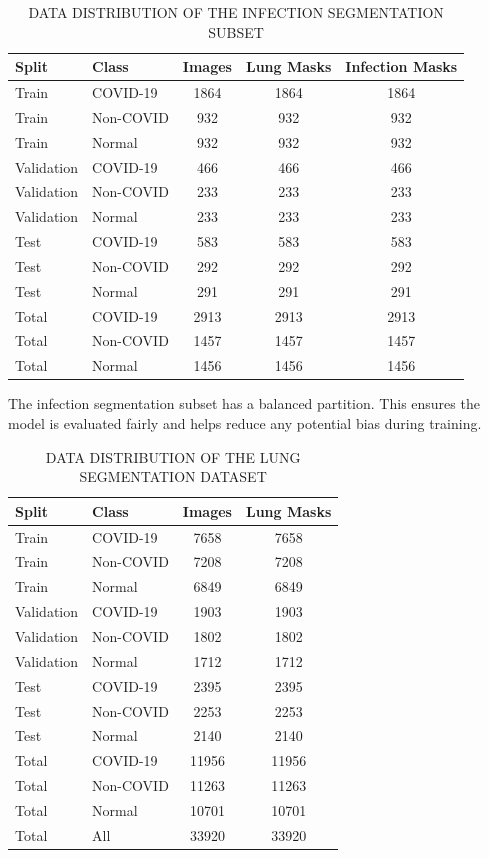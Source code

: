 \documentclass{IEEEtran}
\begin{document}
\renewcommand{\arraystretch}{1.2}
\begin{table}[h]
\centering
\caption{DATA DISTRIBUTION OF THE INFECTION SEGMENTATION SUBSET}
\label{tab:infection_distribution}
\begin{tabular}{l l c c c}
\toprule
\textbf{Split} & \textbf{Class} & \textbf{Images} & \textbf{Lung Masks} & \textbf{Infection Masks} \\
\midrule
Train & COVID-19  & 1864 & 1864 & 1864 \\
Train & Non-COVID & 932  & 932  & 932  \\
Train & Normal    & 932  & 932  & 932  \\
\midrule
Validation & COVID-19  & 466 & 466 & 466 \\
Validation & Non-COVID & 233 & 233 & 233 \\
Validation & Normal    & 233 & 233 & 233 \\
\midrule
Test & COVID-19  & 583 & 583 & 583 \\
Test & Non-COVID & 292 & 292 & 292 \\
Test & Normal    & 291 & 291 & 291 \\
\midrule
Total & COVID-19  & 2913 & 2913 & 2913 \\
Total & Non-COVID & 1457& 1457 & 1457 \\
Total & Normal    & 1456 & 1456 & 1456 \\
\bottomrule
\end{tabular}
\end{table}

The infection segmentation subset has a balanced partition. This ensures the model is evaluated fairly and helps reduce any potential bias during training.


\begin{table}[h]
\centering
\caption{DATA DISTRIBUTION OF THE LUNG SEGMENTATION DATASET}
\label{tab:lung_distribution}
\begin{tabular}{l l c c}
\toprule
\textbf{Split} & \textbf{Class} & \textbf{Images} & \textbf{Lung Masks} \\
\midrule
Train & COVID-19  & 7658 & 7658 \\
Train & Non-COVID & 7208 & 7208 \\
Train & Normal    & 6849 & 6849 \\
\midrule
Validation & COVID-19  & 1903 & 1903 \\
Validation & Non-COVID & 1802 & 1802 \\
Validation & Normal    & 1712 & 1712 \\
\midrule
Test & COVID-19  & 2395 & 2395 \\
Test & Non-COVID & 2253 & 2253 \\
Test & Normal    & 2140 & 2140 \\
\midrule
Total & COVID-19  & 11956 & 11956 \\
Total & Non-COVID & 11263 & 11263 \\
Total & Normal    & 10701 & 10701 \\
Total & All& 33920}& 33920 \\
\bottomrule
\end{tabular}
\end{table}
\end{document}
